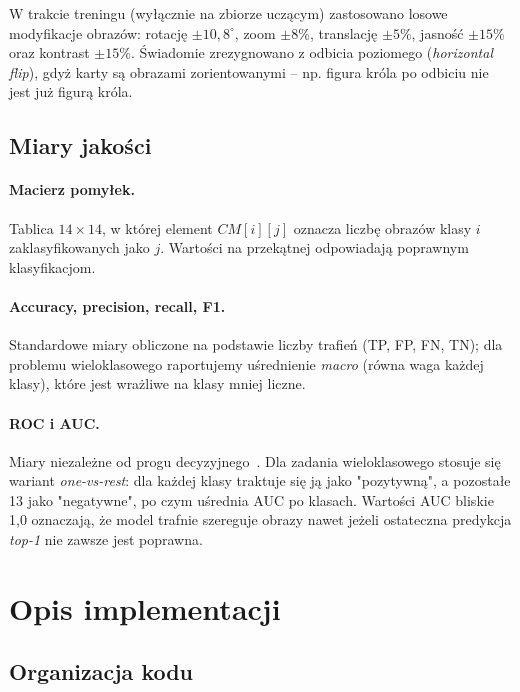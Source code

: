 \documentclass[12pt]{article}
\begin{document}
W trakcie treningu (wyłącznie na zbiorze uczącym) zastosowano losowe modyfikacje obrazów: rotację $\pm 10{,}8^\circ$, zoom $\pm 8\%$, translację $\pm 5\%$, jasność $\pm 15\%$ oraz kontrast $\pm 15\%$. Świadomie zrezygnowano z odbicia poziomego (\textit{horizontal flip}), gdyż karty są obrazami zorientowanymi -- np. figura króla po odbiciu nie jest już figurą króla.

\subsection{Miary jakości}

\paragraph{Macierz pomyłek.} Tablica $14 \times 14$, w której element $CM[i][j]$ oznacza liczbę obrazów klasy $i$ zaklasyfikowanych jako $j$. Wartości na przekątnej odpowiadają poprawnym klasyfikacjom.

\paragraph{Accuracy, precision, recall, F1.} Standardowe miary obliczone na podstawie liczby trafień (TP, FP, FN, TN); dla problemu wieloklasowego raportujemy uśrednienie \textit{macro} (równa waga każdej klasy), które jest wrażliwe na klasy mniej liczne.

\paragraph{ROC i AUC.} Miary niezależne od progu decyzyjnego~\cite{fawcett}. Dla zadania wieloklasowego stosuje się wariant \textit{one-vs-rest}: dla każdej klasy traktuje się ją jako "pozytywną", a pozostałe 13 jako "negatywne", po czym uśrednia AUC po klasach. Wartości AUC bliskie 1{,}0 oznaczają, że model trafnie szereguje obrazy nawet jeżeli ostateczna predykcja \textit{top-1} nie zawsze jest poprawna.

\section{Opis implementacji}

\subsection{Organizacja kodu}
\end{document}

